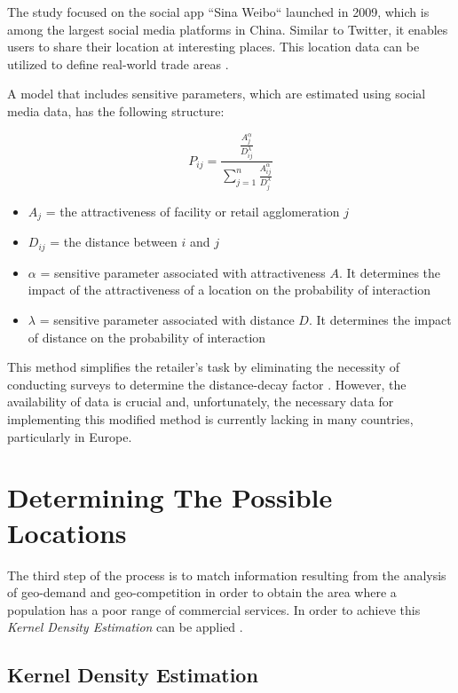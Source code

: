 The study focused on the social app ``Sina Weibo`` launched in 2009, which is among the largest social media platforms in China. Similar to Twitter, it enables users to share their location at interesting places. This location data can be utilized to define real-world trade areas \cite{wang2016evaluating}.

A model that includes sensitive parameters, which are estimated using social media data, has the following structure:

\begin{equation}
P_{ij}=\frac{ \frac{A_{j}^\alpha}{D_{ij}^\lambda} }{ \sum_{j=1}^{n} \frac{A_{ij}^\alpha}{D_{j}^\lambda} }
\label{SocialMediaEquation}
\end{equation}

\begin{itemize}
    \item{$A_{j}$ = the attractiveness of facility or retail agglomeration $j$}
    \item{$D_{ij}$ = the distance between $i$ and $j$}
    \item{$\alpha$ = sensitive parameter associated with attractiveness $A$. It determines the impact of the attractiveness of a location on the probability of interaction}
    \item{$\lambda$ = sensitive parameter associated with distance $D$. It determines the impact of distance on the probability of interaction}
\end{itemize}

This method simplifies the retailer's task by eliminating the necessity of conducting surveys to determine the distance-decay factor \cite{wang2016evaluating}. However, the availability of data is crucial and, unfortunately, the necessary data for implementing this modified method is currently lacking in many countries, particularly in Europe.

\section{Determining The Possible Locations}
\label{sec:determiningThePossibleLocations}

The third step of the process is to match information resulting from the analysis of geo-demand and geo-competition in order to obtain the area where a population has a poor range of commercial services. In order to achieve this \textit{Kernel Density Estimation} can be applied \cite{roig2013retail}.

\subsection{Kernel Density Estimation}
\label{subsec:kde}


